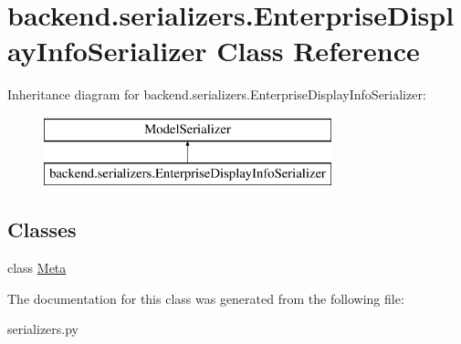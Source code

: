 \hypertarget{classbackend_1_1serializers_1_1_enterprise_display_info_serializer}{}\section{backend.\+serializers.\+Enterprise\+Display\+Info\+Serializer Class Reference}
\label{classbackend_1_1serializers_1_1_enterprise_display_info_serializer}
Inheritance diagram for backend.\+serializers.\+Enterprise\+Display\+Info\+Serializer\+:\begin{figure}[H]
\begin{center}
\leavevmode
\includegraphics[height=2.000000cm]{classbackend_1_1serializers_1_1_enterprise_display_info_serializer}
\end{center}
\end{figure}
\subsection*{Classes}
\begin{DoxyCompactItemize}
\item 
class \hyperlink{classbackend_1_1serializers_1_1_enterprise_display_info_serializer_1_1_meta}{Meta}
\end{DoxyCompactItemize}


The documentation for this class was generated from the following file\+:\begin{DoxyCompactItemize}
\item 
serializers.\+py\end{DoxyCompactItemize}
